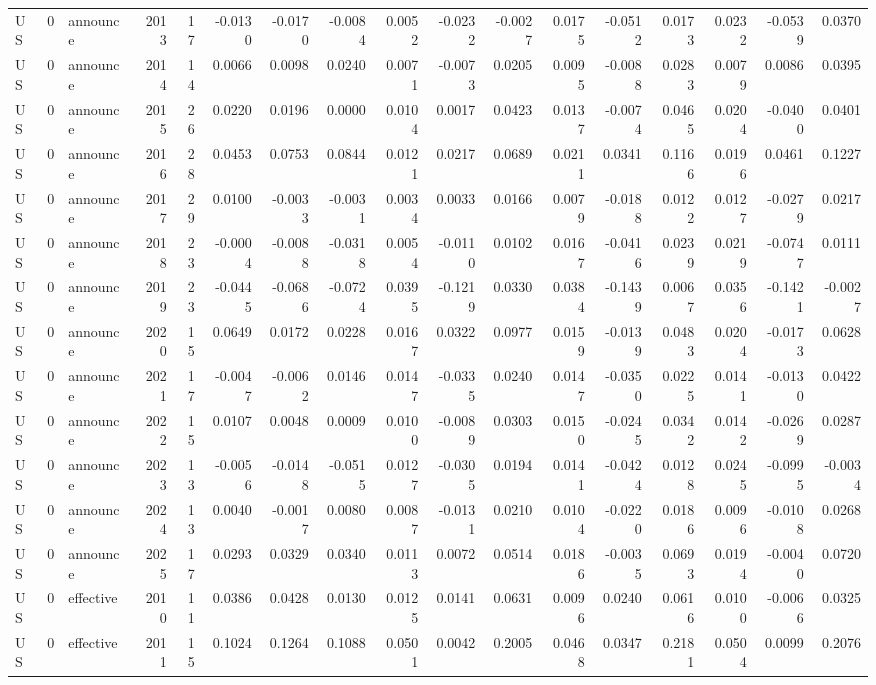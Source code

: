 \begin{tabular}{lrlrrrrrrrrrrrrrr}
US & 0 & announce & 2013 & 17 & -0.0130 & -0.0170 & -0.0084 & 0.0052 & -0.0232 & -0.0027 & 0.0175 & -0.0512 & 0.0173 & 0.0232 & -0.0539 & 0.0370 \\
US & 0 & announce & 2014 & 14 & 0.0066 & 0.0098 & 0.0240 & 0.0071 & -0.0073 & 0.0205 & 0.0095 & -0.0088 & 0.0283 & 0.0079 & 0.0086 & 0.0395 \\
US & 0 & announce & 2015 & 26 & 0.0220 & 0.0196 & 0.0000 & 0.0104 & 0.0017 & 0.0423 & 0.0137 & -0.0074 & 0.0465 & 0.0204 & -0.0400 & 0.0401 \\
US & 0 & announce & 2016 & 28 & 0.0453 & 0.0753 & 0.0844 & 0.0121 & 0.0217 & 0.0689 & 0.0211 & 0.0341 & 0.1166 & 0.0196 & 0.0461 & 0.1227 \\
US & 0 & announce & 2017 & 29 & 0.0100 & -0.0033 & -0.0031 & 0.0034 & 0.0033 & 0.0166 & 0.0079 & -0.0188 & 0.0122 & 0.0127 & -0.0279 & 0.0217 \\
US & 0 & announce & 2018 & 23 & -0.0004 & -0.0088 & -0.0318 & 0.0054 & -0.0110 & 0.0102 & 0.0167 & -0.0416 & 0.0239 & 0.0219 & -0.0747 & 0.0111 \\
US & 0 & announce & 2019 & 23 & -0.0445 & -0.0686 & -0.0724 & 0.0395 & -0.1219 & 0.0330 & 0.0384 & -0.1439 & 0.0067 & 0.0356 & -0.1421 & -0.0027 \\
US & 0 & announce & 2020 & 15 & 0.0649 & 0.0172 & 0.0228 & 0.0167 & 0.0322 & 0.0977 & 0.0159 & -0.0139 & 0.0483 & 0.0204 & -0.0173 & 0.0628 \\
US & 0 & announce & 2021 & 17 & -0.0047 & -0.0062 & 0.0146 & 0.0147 & -0.0335 & 0.0240 & 0.0147 & -0.0350 & 0.0225 & 0.0141 & -0.0130 & 0.0422 \\
US & 0 & announce & 2022 & 15 & 0.0107 & 0.0048 & 0.0009 & 0.0100 & -0.0089 & 0.0303 & 0.0150 & -0.0245 & 0.0342 & 0.0142 & -0.0269 & 0.0287 \\
US & 0 & announce & 2023 & 13 & -0.0056 & -0.0148 & -0.0515 & 0.0127 & -0.0305 & 0.0194 & 0.0141 & -0.0424 & 0.0128 & 0.0245 & -0.0995 & -0.0034 \\
US & 0 & announce & 2024 & 13 & 0.0040 & -0.0017 & 0.0080 & 0.0087 & -0.0131 & 0.0210 & 0.0104 & -0.0220 & 0.0186 & 0.0096 & -0.0108 & 0.0268 \\
US & 0 & announce & 2025 & 17 & 0.0293 & 0.0329 & 0.0340 & 0.0113 & 0.0072 & 0.0514 & 0.0186 & -0.0035 & 0.0693 & 0.0194 & -0.0040 & 0.0720 \\
US & 0 & effective & 2010 & 11 & 0.0386 & 0.0428 & 0.0130 & 0.0125 & 0.0141 & 0.0631 & 0.0096 & 0.0240 & 0.0616 & 0.0100 & -0.0066 & 0.0325 \\
US & 0 & effective & 2011 & 15 & 0.1024 & 0.1264 & 0.1088 & 0.0501 & 0.0042 & 0.2005 & 0.0468 & 0.0347 & 0.2181 & 0.0504 & 0.0099 & 0.2076 \\

\end{tabular}
